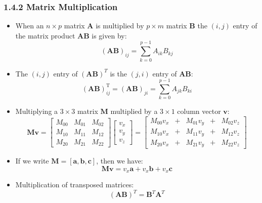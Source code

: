 \documentclass[11pt]{article}
\newcommand{\bm}[1]{\mathbf{#1}}
\begin{document}
\subsubsection*{1.4.2 Matrix Multiplication}
\begin{itemize}
    \item When an $n \times p$ matrix $\bm{A}$ is multiplied by $p \times m$ matrix $\bm{B}$ the
        $(i, j)$ entry of the matrix product $\bm{AB}$ is given by:
        \begin{equation}
            (\bm{AB})_{ij} = \sum_{k=0}^{p-1} A_{ik} B_{kj}
        \end{equation}

    \item The $(i, j)$ entry of $(\bm{AB})^T$ is the $(j, i)$ entry of $\bm{AB}$:
        \begin{equation}
            (\bm{AB})^\text{T}_{ij} = (\bm{AB})_{ji} = \sum_{k=0}^{p-1} A_{jk} B_{ki}
        \end{equation}

    \item Multiplying a $3 \times 3$ matrix $\bm{M}$ multiplied by a $3 \times 1$ column vector
        $\bm{v}$:
        $$
        \bm{Mv} =
        \begin{bmatrix}
            M_{00} & M_{01} & M_{02} \\
            M_{10} & M_{11} & M_{12} \\
            M_{20} & M_{21} & M_{22}
        \end{bmatrix}
        \begin{bmatrix}
            v_x \\
            v_y \\
            v_z
        \end{bmatrix} =
        \begin{bmatrix}
            M_{00} v_x &+& M_{01} v_y &+& M_{02} v_z \\
            M_{10} v_x &+& M_{11} v_y &+& M_{12} v_z \\
            M_{20} v_x &+& M_{21} v_y &+& M_{22} v_z
        \end{bmatrix}
        $$

\item If we write $\bm{M} = [\bm{a}, \bm{b}, \bm{c}]$, then we have:
    \begin{equation}
        \mathbf{Mv} = v_x \mathbf{a} + v_x \mathbf{b} + v_x \mathbf{c}
    \end{equation}
\item Multiplication of transposed matrices:
    \begin{equation}
        (\bm{AB})^T = \bm{B}^T \bm{A}^T
    \end{equation}
\end{itemize}
\end{document}
